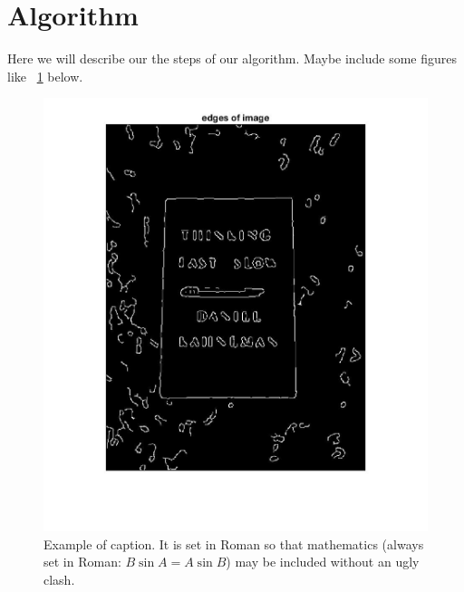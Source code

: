 \section{Algorithm}
\label{sec:algorithm}

Here we will describe our the steps of our algorithm.
Maybe include some figures like ~\ref{fig:onecol} below.

\begin{figure}[t]
\begin{center}
   \includegraphics[width=0.8\linewidth]{figures/edgeDetection.jpg}
\end{center}
   \caption{Example of caption.  It is set in Roman so that mathematics
   (always set in Roman: $B \sin A = A \sin B$) may be included without an
   ugly clash.}
\label{fig:long}
\label{fig:onecol}
\end{figure}
